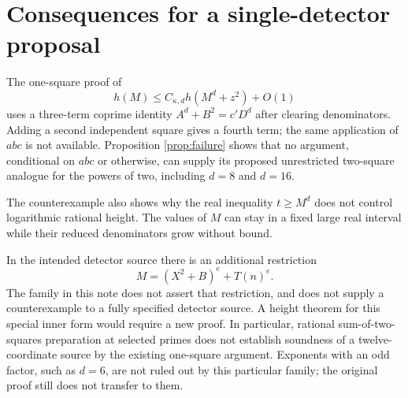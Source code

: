 \documentclass[11pt,a4paper]{article}
\begin{document}
\section*{Consequences for a single-detector proposal}

The one-square proof of
\[
              h(M)\le C_{\kappa,d}h(M^d+z^2)+O(1)
\]
uses a three-term coprime identity $A^d+B^2=c'D^d$ after clearing
denominators. Adding a second independent square gives a fourth term;
the same application of $abc$ is not available. Proposition
\ref{prop:failure} shows that no argument, conditional on $abc$ or
otherwise, can supply its proposed unrestricted two-square analogue
for the powers of two, including $d=8$ and $d=16$.

The counterexample also shows why the real inequality $t\ge M^d$
does not control logarithmic rational height. The values of $M$ can
stay in a fixed large real interval while their reduced denominators
grow without bound.

In the intended detector source there is an additional restriction
\[
               M=(X^2+B)^e+T(n)^e.
\]
The family in this note does not assert that restriction, and does
not supply a counterexample to a fully specified detector source.
A height theorem for this special inner form would require a new
proof. In particular, rational sum-of-two-squares preparation at
selected primes does not establish soundness of a twelve-coordinate
source by the existing one-square argument. Exponents with an odd
factor, such as $d=6$, are not ruled out by this particular family;
the original proof still does not transfer to them.
\end{document}
